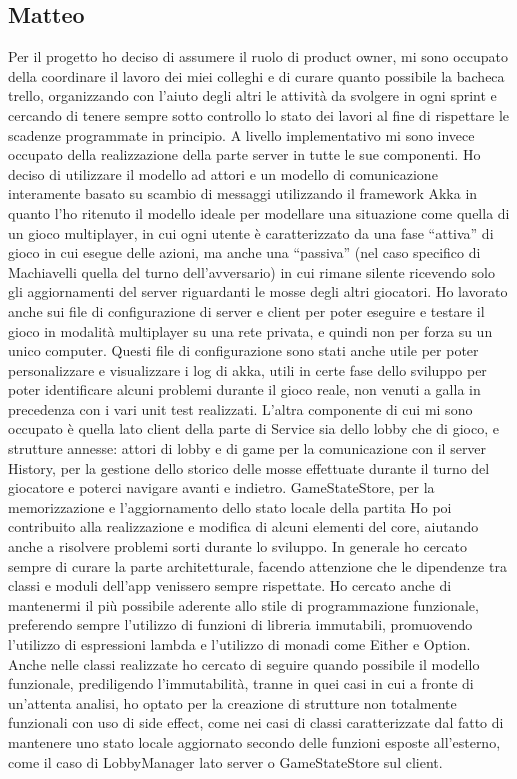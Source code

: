 \subsection{Matteo}
Per il progetto ho deciso di assumere il ruolo di product owner, mi sono occupato della coordinare il lavoro dei miei colleghi e di curare quanto possibile la bacheca trello, organizzando con l’aiuto degli altri le attività da svolgere in ogni sprint e cercando di tenere sempre sotto controllo lo stato dei lavori al fine di rispettare le scadenze programmate in principio.
A livello implementativo mi sono invece occupato della realizzazione della parte server in tutte le sue componenti.
Ho deciso di utilizzare il modello ad attori e un modello di comunicazione interamente basato su scambio di messaggi utilizzando il framework Akka in quanto l’ho ritenuto il modello ideale per modellare una situazione come quella di un gioco multiplayer, in cui ogni utente è caratterizzato da una fase “attiva” di gioco in cui esegue delle azioni, ma anche una “passiva” (nel caso specifico di Machiavelli quella del turno dell’avversario) in cui rimane silente ricevendo solo gli aggiornamenti del server riguardanti le mosse degli altri giocatori.
Ho lavorato anche sui file di configurazione di server e client per poter eseguire e testare il gioco in modalità multiplayer su una rete privata, e quindi non per forza su un unico computer.
Questi file di configurazione sono stati anche utile per poter personalizzare e visualizzare i log di akka, utili in certe fase dello sviluppo per poter identificare alcuni problemi durante il gioco reale, non venuti a galla in precedenza con i vari unit test realizzati.
L’altra componente di cui mi sono occupato è quella lato client della parte di Service sia dello lobby che di gioco, e strutture annesse:
attori di lobby e di game per la comunicazione con il server
History, per la gestione dello storico delle mosse effettuate durante il turno del giocatore e poterci navigare avanti e indietro.
GameStateStore, per la memorizzazione e l’aggiornamento dello stato locale della partita
Ho poi contribuito alla realizzazione e modifica di alcuni elementi del core, aiutando anche a risolvere problemi sorti durante lo sviluppo.
In generale ho cercato sempre di curare la parte architetturale, facendo attenzione che le dipendenze tra classi e moduli dell’app venissero sempre rispettate.
Ho cercato anche di mantenermi il più possibile aderente allo stile di programmazione funzionale, preferendo sempre l’utilizzo di funzioni di libreria immutabili, promuovendo l’utilizzo di espressioni lambda e l’utilizzo di monadi come Either e Option.
Anche nelle classi realizzate ho cercato di seguire quando possibile il modello funzionale, prediligendo l’immutabilità, tranne in quei casi in cui a fronte di un’attenta analisi, ho optato per la creazione di strutture non totalmente funzionali con uso di side effect, come nei casi di classi caratterizzate dal fatto di mantenere uno stato locale aggiornato secondo delle funzioni esposte all’esterno, come il caso di LobbyManager lato server o GameStateStore sul client.


